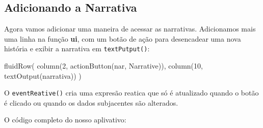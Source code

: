\documentclass[
]{book}
\newenvironment{Shaded}{\begin{snugshade}}{\end{snugshade}}
\newcommand{\DecValTok}[1]{\textcolor[rgb]{0.00,0.00,0.81}{#1}}
\newcommand{\FunctionTok}[1]{\textcolor[rgb]{0.00,0.00,0.00}{#1}}
\newcommand{\NormalTok}[1]{#1}
\newcommand{\OtherTok}[1]{\textcolor[rgb]{0.56,0.35,0.01}{#1}}
\newcommand{\SpecialCharTok}[1]{\textcolor[rgb]{0.00,0.00,0.00}{#1}}
\newcommand{\StringTok}[1]{\textcolor[rgb]{0.31,0.60,0.02}{#1}}
\begin{document}
\hypertarget{adicionando-a-narrativa}{%
\subsection{\texorpdfstring{\textbf{Adicionando a Narrativa}}{Adicionando a Narrativa}}\label{adicionando-a-narrativa}}

Agora vamos adicionar uma maneira de acessar as narrativas. Adicionamos mais uma linha na função \textbf{ui}, com um botão de ação para desencadear uma nova história e exibir a narrativa em \texttt{textPutput()}:

\begin{Shaded}
\begin{Highlighting}[]
\FunctionTok{fluidRow}\NormalTok{(}
    \FunctionTok{column}\NormalTok{(}\DecValTok{2}\NormalTok{, }\FunctionTok{actionButton}\NormalTok{(}\StringTok{\textquotesingle{}nar\textquotesingle{}}\NormalTok{, }\StringTok{\textquotesingle{}Narrative\textquotesingle{}}\NormalTok{)),}
    \FunctionTok{column}\NormalTok{(}\DecValTok{10}\NormalTok{, }\FunctionTok{textOutput}\NormalTok{(}\StringTok{\textquotesingle{}narrativa\textquotesingle{}}\NormalTok{))}
\NormalTok{  )}
\end{Highlighting}
\end{Shaded}

O \texttt{eventReative()} cria uma expresão reatica que só é atualizado quando o botão é clicado ou quando os dados subjacentes são alterados.

\begin{Shaded}
\end{Shaded}

O código completo do nosso aplivativo:
\end{document}
